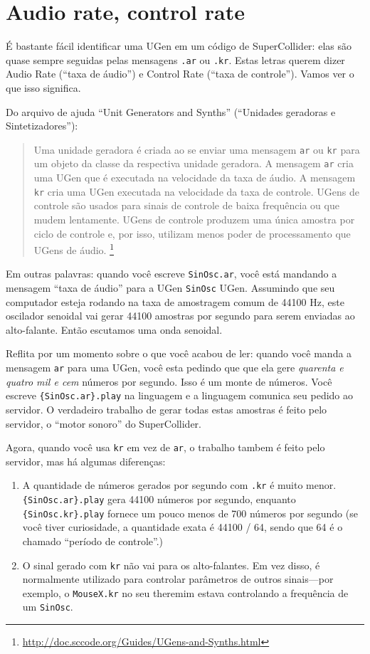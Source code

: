 \section{Audio rate, control rate}

É bastante fácil identificar uma UGen em um código de SuperCollider: elas são quase sempre seguidas pelas mensagens \texttt{.ar} ou \texttt{.kr}. Estas letras querem dizer Audio Rate (“taxa de áudio”) e Control Rate (“taxa de controle”). Vamos ver o que isso significa.

Do arquivo de ajuda “Unit Generators and Synths” (“Unidades geradoras e Sintetizadores”): 

\begin{quotation}
Uma unidade geradora é criada ao se enviar uma mensagem \texttt{ar} ou \texttt{kr} para um objeto da classe da respectiva unidade geradora. A mensagem \texttt{ar} cria uma UGen que é executada na velocidade da taxa de áudio. A mensagem \texttt{kr} cria uma UGen executada na velocidade da taxa de controle. UGens de controle são usados para sinais de controle de baixa frequência ou que mudem lentamente. UGens de controle produzem uma única amostra por ciclo de controle e, por isso, utilizam menos poder de processamento que UGens de áudio. \footnote{\url{http://doc.sccode.org/Guides/UGens-and-Synths.html}}
\end{quotation}

Em outras palavras: quando você escreve \texttt{SinOsc.ar}, você está mandando a mensagem “taxa de áudio” para a UGen  \texttt{SinOsc} UGen. Assumindo que seu computador esteja rodando na taxa de amostragem comum de 44100 Hz, este oscilador senoidal vai gerar 44100 amostras por segundo para serem enviadas ao alto-falante. Então escutamos uma onda senoidal.

Reflita por um momento sobre o que você acabou de ler: quando você manda a mensagem \texttt{ar} para uma UGen, você esta pedindo que que ela gere \emph{quarenta e quatro mil e cem} números por segundo. Isso é um monte de números. Você escreve \texttt{\{SinOsc.ar\}.play} na linguagem e a linguagem comunica seu pedido ao servidor. O verdadeiro trabalho de gerar todas estas amostras é feito pelo servidor, o “motor sonoro” do SuperCollider.

Agora, quando você usa \texttt{kr} em vez de \texttt{ar}, o trabalho tambem é feito pelo servidor, mas há algumas diferenças:
\begin{enumerate}
\item A quantidade de números gerados por segundo com \texttt{.kr} é muito menor. \texttt{\{SinOsc.ar\}.play} gera 44100 números por segundo, enquanto \texttt{\{SinOsc.kr\}.play} fornece um pouco menos de 700 números por segundo (se você tiver curiosidade, a quantidade exata é 44100 / 64, sendo que 64 é o chamado “período de controle”.)
\item O sinal gerado com \texttt{kr} não vai para os alto-falantes. Em vez disso, é normalmente utilizado para controlar parâmetros de outros sinais---por exemplo, o \texttt{MouseX.kr} no seu theremim estava controlando a frequência de um \texttt{SinOsc}.

\end{enumerate} 

